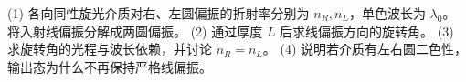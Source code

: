 (1) 各向同性旋光介质对右、左圆偏振的折射率分别为 \(n_R,n_L\)，单色波长为 \(\lambda_0\)。将入射线偏振分解成两圆偏振。
(2) 通过厚度 \(L\) 后求线偏振方向的旋转角。
(3) 求旋转角的光程与波长依赖，并讨论 \(n_R=n_L\)。
(4) 说明若介质有左右圆二色性，输出态为什么不再保持严格线偏振。
